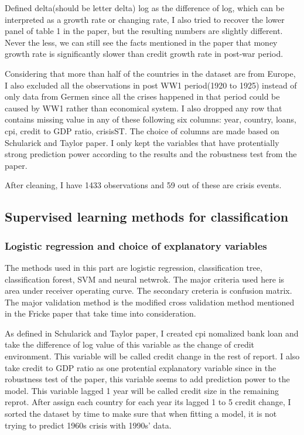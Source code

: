 \documentclass{article}
\begin{document}
Defined delta(should be letter delta) log as the difference of log,
which can be interpreted as a growth rate or changing rate, I also tried
to recover the lower panel of table 1 in the paper, but the resulting
numbers are slightly different. Never the less, we can still see the
facts mentioned in the paper that money growth rate is significantly
slower than credit growth rate in post-war period.

Considering that more than half of the countries in the dataset are from
Europe, I also excluded all the observations in post WW1 period(1920 to
1925) instead of only data from Germen since all the crises happened in
that period could be caused by WW1 rather than economical system. I also
dropped any row that contains missing value in any of these following
six columns: year, country, loans, cpi, credit to GDP ratio, crisisST.
The choice of columns are made based on Schularick and Taylor paper. I
only kept the variables that have protentially strong prediction power
according to the results and the robustness test from the paper.

After cleaning, I have 1433 observations and 59 out of these are crisis
events.

\subsection*{Supervised learning methods for classification}

\subsubsection*{Logistic regression and choice of explanatory variables}

The methods used in this part are logistic regression, classification
tree, classification forest, SVM and neural netwrok. The major criteria
used here is area under receiver operating curve. The secondary creteria
is confusion matrix. The major validation method is the modified cross
validation method mentioned in the Fricke paper that take time into
consideration.

As defined in Schularick and Taylor paper, I created cpi nomalized bank
loan and take the difference of log value of this variable as the change
of credit environment. This variable will be called credit change in the
rest of report. I also take credit to GDP ratio as one protential
explanatory variable since in the robustness test of the paper, this
variable seems to add prediction power to the model. This variable
lagged 1 year will be called credit size in the remaining reprot. After
assign each country for each year its lagged 1 to 5 credit change, I
sorted the dataset by time to make sure that when fitting a model, it is
not trying to predict 1960s crisis with 1990s' data.
\end{document}
